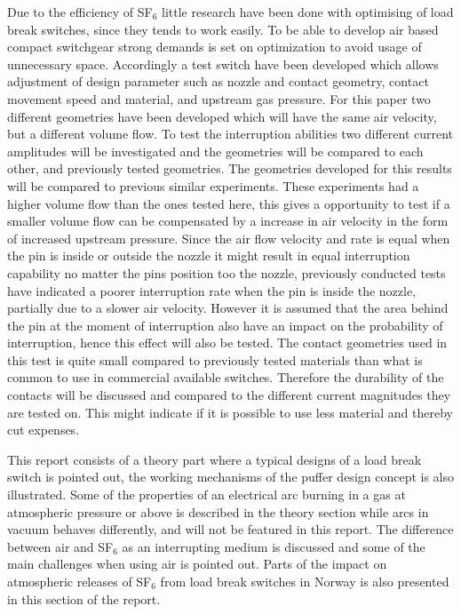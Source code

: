 \documentclass[10pt,a4paper,twoside]{article}
\begin{document}
Due to the efficiency of SF$_6$ little research have been done with optimising of load break switches, since they tends to work easily. To be able to develop air based compact switchgear strong demands is set on optimization to avoid usage of unnecessary space. Accordingly a test switch have been developed which allows adjustment of design parameter such as nozzle and contact geometry, contact movement speed and material, and upstream gas pressure. For this paper two different geometries have been developed which will have the same air velocity, but a different volume flow. To test the interruption abilities two different current amplitudes will be investigated and the geometries will be compared to each other, and previously tested geometries. The geometries developed for this results will be compared to previous similar experiments. These experiments had a higher volume flow than the ones tested here, this gives a opportunity to test if a smaller volume flow can be compensated by a increase in air velocity in the form of increased upstream pressure. Since the air flow velocity and rate is equal when the pin is inside or outside the nozzle it might result in equal interruption capability no matter the pins position too the nozzle, previously conducted tests have indicated a poorer interruption rate when the pin is inside the nozzle, partially due to a slower air velocity. However it is assumed that the area behind the pin at the moment of interruption also have an impact on the probability of interruption, hence this effect will also be tested. The contact geometries used in this test is quite small compared to previously tested materials than what is common to use in commercial available switches. Therefore the durability of the contacts will be discussed and compared to the different current magnitudes they are tested on. This might indicate if it is possible to use less material and thereby cut expenses.

This report consists of a theory part where a typical designs of a load break switch is pointed out, the working mechanisms of the puffer design concept is also illustrated. Some of the properties of an electrical arc burning in a gas at atmospheric pressure or above is described in the theory section while arcs in vacuum behaves differently, and will not be featured in this report. The difference between air and SF$_6$ as an interrupting medium is discussed and some of the main challenges when using air is pointed out. Parts of the impact on atmospheric releases of SF$_6$ from load break switches in Norway is also presented in this section of the report.
\end{document}
